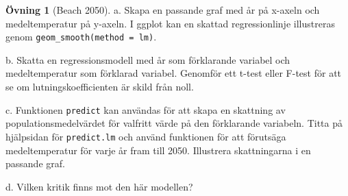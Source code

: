 \documentclass[
]{book}
\theoremstyle{definition}
\theoremstyle{definition}
\theoremstyle{definition}
\newtheorem{exercise}{Övning}[chapter]
\theoremstyle{definition}
\theoremstyle{remark}
\begin{document}
\begin{exercise}[Beach 2050]
a. Skapa en passande graf med år på x-axeln och medeltemperatur på y-axeln. I ggplot kan en skattad regressionlinje illustreras genom \texttt{geom\_smooth(method\ =\ lm)}.

b. Skatta en regressionsmodell med år som förklarande variabel och medeltemperatur som förklarad variabel. Genomför ett t-test eller F-test för att se om lutningskoefficienten är skild från noll.

c. Funktionen \texttt{predict} kan användas för att skapa en skattning av populationsmedelvärdet för valfritt värde på den förklarande variabeln. Titta på hjälpsidan för \texttt{predict.lm} och använd funktionen för att förutsäga medeltemperatur för varje år fram till 2050. Illustrera skattningarna i en passande graf.

d. Vilken kritik finns mot den här modellen?
\end{exercise}
\end{document}
